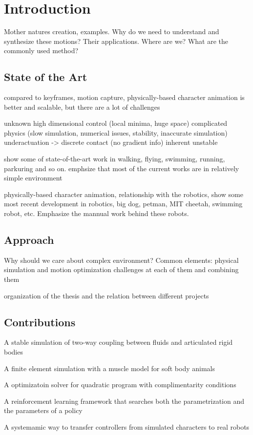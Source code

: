 \chapter{Introduction}

Mother natures creation, examples.
Why do we need to understand and synthesize these motions? Their applications.
Where are we? What are the commonly used method?

\section{State of the Art}

compared to keyframes, motion capture, physically-based character animation is better and scalable, but there are a lot of challenges


unknown high dimensional control (local minima, huge space)
complicated physics (slow simulation, numerical issues, stability, inaccurate simulation)
underactuation -> discrete contact (no gradient info)
inherent unstable

show some of state-of-the-art work in walking, flying, swimming, running, parkuring and so on. emphsize that most of the current works are in relatively simple environment

physically-based character animation, relationship with the robotics, show some most recent development in robotics, big dog, petman, MIT cheetah, swimming robot, etc. Emphasize the mannual work behind these robots.


\section{Approach}
Why should we care about complex environment?
Common elements: physical simulation and motion optimization
challenges at each of them and combining them

organization of the thesis and the relation between different projects


\section{Contributions}

A stable simulation of two-way coupling between fluids and articulated rigid bodies

A finite element simulation with a muscle model for soft body animals

A optimizatoin solver for quadratic program with complimentarity conditions

A reinforcement learning framework that searches both the parametrization and the parameters of a policy

A systemamic way to transfer controllers from simulated characters to real robots

